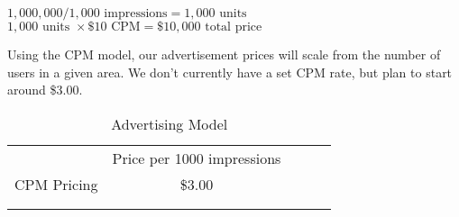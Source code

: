 \begin{center}
$1,000,000 / 1,000 \textrm{ impressions} = 1,000 \textrm{ units}$\\
$1,000 \textrm{ units } \times \$10 \textrm{ CPM} = \$10,000 \textrm{ total price}$
\end{center}

Using the CPM model, our advertisement prices will scale from the number of users in a given area. We don't currently have a set CPM rate, but plan to start around \$3.00.

\begin {table}[H]
\caption {Advertising Model} \label{tab:title} 
\begin{center}
\begin{tabular}{lllll}
\cline{1-2}
\multicolumn{1}{|c|}{} & \multicolumn{1}{c|}{Price per 1000 impressions} & \multicolumn{1}{c}{} & \multicolumn{1}{c}{} &  \\ \cline{1-2}
\multicolumn{1}{|c|}{CPM Pricing} & \multicolumn{1}{c|}{\$3.00} & \multicolumn{1}{c}{} & \multicolumn{1}{c}{} &  \\ \cline{1-2}
                       &                       &                      &                      &  \\
                       &                       &                      &                      & 
\end{tabular}
\end{center}
\end{table}

